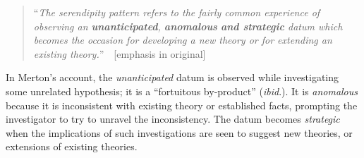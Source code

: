 \begin{quote}
``\emph{The serendipity pattern refers to the fairly common experience of observing an \emph{\textbf{unanticipated}}, \emph{\textbf{anomalous}} \emph{\textbf{and strategic}} datum which becomes the occasion for developing a new theory or for extending an existing theory.}''~\cite[p. 506]{merton1948bearing}~{[}emphasis in original{]}
\end{quote}
In Merton's account, the \emph{unanticipated} datum is observed while investigating some unrelated hypothesis; it is a ``fortuitous by-product'' (\emph{ibid}.). It is \emph{anomalous} because it is inconsistent with existing theory or established facts, prompting the investigator to try to unravel the inconsistency. The datum becomes \emph{strategic} when the implications of such investigations are seen to suggest new theories, or extensions of existing theories.


